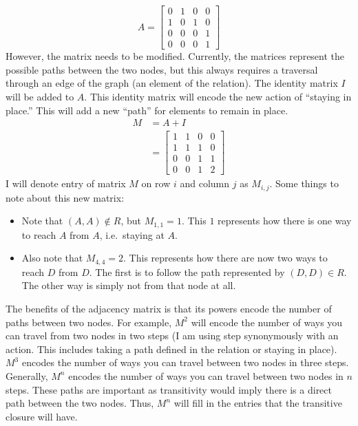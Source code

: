\[A=\begin{bmatrix}
    0 & 1 & 0 & 0 \\
    1 & 0 & 1 & 0 \\
    0 & 0 & 0 & 1 \\
    0 & 0 & 0 & 1
\end{bmatrix}\] 
However, the matrix needs to be modified. Currently, the matrices represent the possible paths between the
two nodes, but this always requires a traversal through an edge of the graph (an element of the relation).
The identity matrix \(I\) will be added to \(A\). This identity matrix will encode the new action of ``staying
in place.'' This will add a new ``path'' for elements to remain in place. 
\begin{align*}
    M&=A+I \\ 
     &=\begin{bmatrix}
        1 & 1 & 0 & 0 \\
        1 & 1 & 1 & 0 \\
        0 & 0 & 1 & 1 \\
        0 & 0 & 1 & 2
     \end{bmatrix}
\end{align*}
I will denote entry of matrix \(M\) on row \(i\) and column \(j\) as \(M_{i,j}\). Some things to note about this 
new matrix:
\begin{itemize}
    \item Note that \((A,A)\not\in R\), but \(M_{1,1}=1\). This \(1\) represents how there is one way to reach \(A\)
    from \(A\), i.e.\ staying at \(A\).
    \item Also note that \(M_{4,4}=2\). This represents how there are now two ways to reach \(D\) from \(D\). The first
    is to follow the path represented by \((D,D)\in R\). The other way is simply not from that node at all.
\end{itemize}
The benefits of the adjacency matrix is that its powers encode the number of paths between two nodes. For example,
\(M^2\) will encode the number of ways you can travel from two nodes in two steps (I am using step synonymously with
an action. This includes taking a path defined in the relation or staying in place). \(M^3\) encodes the number of ways
you can travel between two nodes in three steps. Generally, \(M^n\) encodes the number of ways you can travel between
two nodes in \(n\) steps. These paths are important as transitivity would imply there is a direct path between the two
nodes. Thus, \(M^n\) will fill in the entries that the transitive closure will have.

